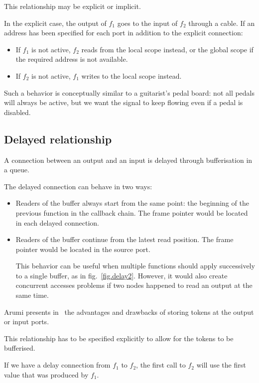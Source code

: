 \documentclass{article}
\begin{document}
This relationship may be explicit or implicit.

In the explicit case, the output of $f_1$ goes to the input of $f_2$ through a cable. 
If an address has been specified for each port in addition to the explicit connection:
\begin{itemize}
	\item If $f_1$ is not active, $f_2$ reads from the local scope instead, or the global scope if the required address is not available.
	\item If $f_2$ is not active, $f_1$ writes to the local scope instead.
\end{itemize}

Such a behavior is conceptually similar to a guitarist's pedal board: not all pedals will always be active, but we want the signal to keep flowing even if a pedal is disabled.

\subsection{Delayed relationship}
A connection between an output and an input is delayed through bufferisation in a queue.
	
The delayed connection can behave in two ways:
\begin{itemize}
  \item Readers of the buffer always start from the same point: the beginning of the previous function in the callback chain. 
  The frame pointer would be located in each delayed connection.
  \item Readers of the buffer continue from the latest read position. 
  The frame pointer would be located in the source port.

  This behavior can be useful when multiple functions should apply successively to a single buffer, as in fig.~\ref{fig.delay2}.
  However, it would also create concurrent accesses problems if two nodes happened to read an output at the same time.
  
  
\end{itemize}

Arumi presents in~\cite{arumi2006dataflow} the advantages and drawbacks of storing tokens at the output or input ports.

This relationship has to be specified explicitly to allow for the tokens to be bufferised.
    
If we have a delay connection from $f_1$ to $f_2$, the first call to $f_2$ will use the first value that was produced by $f_1$.
\end{document}
